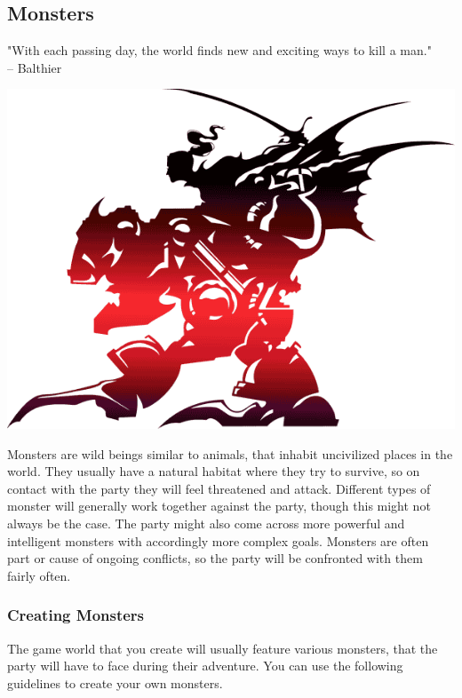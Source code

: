 \subsection*{\hypertarget{monster}{Monsters}}
"With each passing day, the world finds new and exciting ways to kill a man."\\
\indent -- Balthier
\vspace*{0.3cm}
\begin{center} \includegraphics[width=\columnwidth]{./art/images/ff6.png} \end{center}
\vspace*{0.3cm}
%
Monsters are wild beings similar to animals, that inhabit uncivilized places in the world.
They usually have a natural habitat where they try to survive, so on contact with the party they will feel threatened and attack.
Different types of monster will generally work together against the party, though this might not always be the case.
The party might also come across more powerful and intelligent monsters with accordingly more complex goals.
Monsters are often part or cause of ongoing conflicts, so the party will be confronted with them fairly often.

\subsubsection*{Creating Monsters}
The game world that you create will usually feature various monsters, that the party will have to face during their adventure. 
You can use the following guidelines to create your own monsters.

